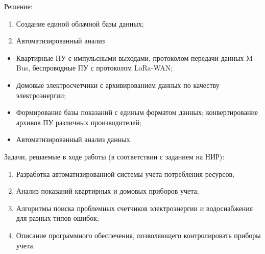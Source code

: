 Решение: 
\begin{enumerate}
	\item Создание единой облачной базы данных; 
	\item Автоматизированный анализ
\end{enumerate}

\begin{itemize}
	\item Квартирные ПУ с импульсными выходами, протоколом передачи данных M-Bus, беспроводные ПУ с протоколом LoRa-WAN;
	\item Домовые электросчетчики с архивированием данных по качеству электроэнергии;
	\item Формирование базы показаний с единым форматом данных; конвертирование архивов ПУ различных производителей;
	\item Автоматизированный анализ данных.
\end{itemize}

Задачи, решаемые в ходе работы (в соответствии с заданием на НИР):
 \begin{enumerate}
 	\item Разработка автоматизированной системы учета потребления ресурсов;
	\item Анализ показаний квартирных и домовых приборов учета; 
	\item Алгоритмы поиска проблемных счетчиков электроэнергии и водоснабжения для разных типов ошибок;
	\item Описание программного обеспечения, позволяющего контролировать приборы учета.
\end{enumerate}
